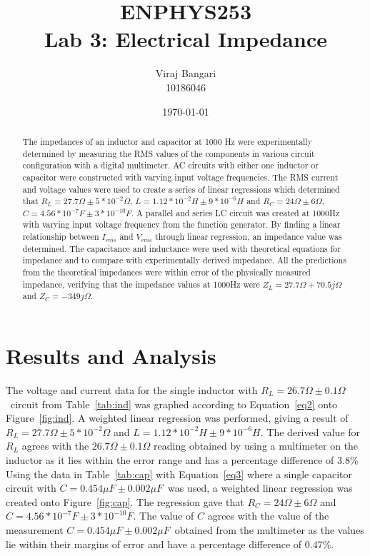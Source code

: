 \documentclass[]{article}
\title{ENPHYS253 \\ Lab 3: Electrical Impedance}
\author{Viraj Bangari \\ 10186046}
\date{\today}
\newcommand{\getMeasuredC}{$C = 0.454 \mu F \pm 0.002 \mu F $}
\newcommand{\getMeasuredR}{$R_{L} = 26.7 \Omega \pm 0.1 \Omega $}
\begin{document}
 
\maketitle

\begin{abstract}
    The impedances of an inductor and capacitor at 1000 Hz were experimentally
    determined by measuring the RMS values of the components in various circuit
    configuration with a digital multimeter. AC circuits with either one
    inductor or capacitor were constructed with varying input voltage
    frequencies. The RMS current and voltage values were used to create a series
    of linear regressions which determined that $R_L = 27.7 \Omega \pm 5 *
    10^{-2} \Omega$, $L = 1.12 * 10 ^{-2} H \pm 9 * 10^{-6} H$ and $R_C = 24
    \Omega \pm 6 \Omega$, $C = 4.56*10^{-7} F \pm 3*10^{-10} F$. A parallel and
    series LC circuit was created at 1000Hz with varying input voltage frequency
    from the function generator. By finding a linear relationship between
    $I_{rms}$ and $V_{rms}$ through linear regression, an impedance value was
    determined. The capacitance and inductance were used with theoretical
    equations for impedance and to compare with experimentally derived
    impedance. All the predictions from the theoretical impedances were within
    error of the physically measured impedance, verifying that the impedance
    values at 1000Hz were $Z_L = 27.7 \Omega + 70.5j \Omega$  and $Z_C = -349j
    \Omega$.
\end{abstract}

\section*{Results and Analysis}
The voltage and current data for the single inductor with \getMeasuredR\ circuit
from Table~\ref{tab:ind} was graphed according to Equation~\ref{eq2} onto
Figure~\ref{fig:ind}. A weighted linear regression was performed, giving a
result of $R_L = 27.7 \Omega \pm 5 * 10^{-2} \Omega$ and $L = 1.12 * 10 ^{-2}
H \pm 9 * 10^{-6} H$. The derived value for $R_L$ agrees with the $26.7 \Omega \pm
0.1 \Omega$ reading obtained by using a multimeter on the inductor as it lies
within the error range and has a percentage difference of 3.8\% Using the
data in Table~\ref{tab:cap} with Equation~\ref{eq3} where a single capacitor
circuit with \getMeasuredC\ was used, a weighted linear regression was created
onto Figure~\ref{fig:cap}. The regression gave that $R_C = 24 \Omega \pm
6 \Omega$ and $C = 4.56*10^{-7} F \pm 3*10^{-10} F$. The value of $C$ agrees with
the value of the measurement \getMeasuredC\ obtained from the multimeter as the
values lie within their margins of error and have a percentage difference of
0.47\%.
\end{document}
